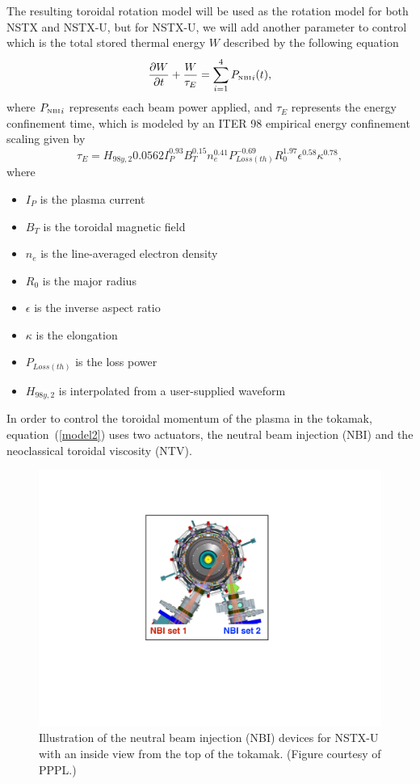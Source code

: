 \documentclass[12pt,lot, lof]{puthesis}
\begin{document}
The resulting toroidal rotation model will be used as the rotation model for both NSTX and NSTX-U, but for NSTX-U, we will add another parameter to control which is the total stored thermal energy $W$ described by the following equation
\begin{equation}
\frac{\partial W}{\partial t}
   + \frac{W}{\tau_E}  =\sum_{i=1}^{4}{P_\textrm{\tiny{NBI}}}_i(t),
\label{energy}
\end{equation}
where ${P_\textrm{\tiny{NBI}}}_i$ represents each beam power applied, and ${\tau_E} $ represents the energy confinement time, which is modeled by an ITER 98 empirical energy confinement scaling \cite{Iter99} given by
\begin{equation}
\tau_E = H_{98y,2} 0.0562 I_{P}^{0.93} B_{T}^{0.15} n_{e}^{0.41} P_{Loss(th)}^{-0.69} R_{0}^{1.97} {\epsilon}^{0.58} \kappa^{0.78},
\end{equation}
where
\begin{itemize}
\item $I_P$ is the plasma current
\item $B_T$ is the toroidal magnetic field
\item $n_e$ is the line-averaged electron density 
\item $R_0$ is the major radius
\item $\epsilon$ is the inverse aspect ratio
\item $\kappa$ is the elongation
\item $P_{Loss(th)}$ is the loss power
\item $H_{98y,2} $ is interpolated from a user-supplied waveform
\end{itemize}

In order to control the toroidal momentum of the plasma in the tokamak, equation~(\ref{model2}) uses two actuators, the neutral beam injection (NBI) and the neoclassical toroidal viscosity (NTV). 

\begin{figure}
\centering
\includegraphics[width=0.6\linewidth]{nnbbii}
\caption{Illustration of the neutral beam injection (NBI) devices for NSTX-U with an inside view from the top of the tokamak. (Figure courtesy of PPPL.)}
\label{figmod6}
\end{figure}
\end{document}

